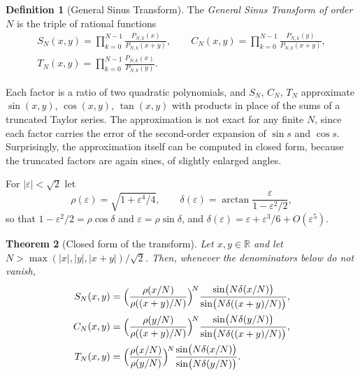 \documentclass[11pt]{amsart}
\newtheorem{thm}{Theorem}[section]
\theoremstyle{definition}
\newtheorem{defn}[thm]{Definition}
\theoremstyle{remark}
\numberwithin{equation}{section}
\begin{document}
\begin{defn}[General Sinus Transform]
\label{defn:GST}
The \emph{General Sinus Transform of order $N$} is the triple of rational
functions
\begin{gather*}
S_N(x,y) = \prod_{k=0}^{N-1}\frac{P_{N,k}(x)}{P_{N,k}(x+y)}, \qquad
C_N(x,y) = \prod_{k=0}^{N-1}\frac{P_{N,k}(y)}{P_{N,k}(x+y)}, \\
T_N(x,y) = \prod_{k=0}^{N-1}\frac{P_{N,k}(x)}{P_{N,k}(y)} .
\end{gather*}
\end{defn}

Each factor is a ratio of two quadratic polynomials, and $S_N$, $C_N$,
$T_N$ approximate $\sin(x,y)$, $\cos(x,y)$, $\tan(x,y)$ with products in
place of the sums of a truncated Taylor series. The approximation is not
exact for any finite $N$, since each factor carries the error of the
second-order expansion of $\sin s$ and $\cos s$. Surprisingly, the
approximation itself can be computed in closed form, because the
truncated factors are again sines, of slightly enlarged angles.

For $|\varepsilon| < \sqrt2$ let
\begin{equation}
\label{eq:rho-delta}
\rho(\varepsilon) = \sqrt{1 + \varepsilon^4/4}, \qquad
\delta(\varepsilon) = \arctan\frac{\varepsilon}{1 - \varepsilon^2/2},
\end{equation}
so that $1 - \varepsilon^2/2 = \rho\cos\delta$ and $\varepsilon = \rho\sin\delta$,
and $\delta(\varepsilon) = \varepsilon + \varepsilon^3/6 + O(\varepsilon^5)$.

\begin{thm}[Closed form of the transform]
\label{thm:GST-closed}
Let $x, y \in \mathbb{R}$ and let $N > \max(|x|, |y|, |x+y|)/\sqrt2$. Then,
whenever the denominators below do not vanish,
\begin{align}
\label{eq:SN-closed}
S_N(x,y) &= \Bigl(\frac{\rho(x/N)}{\rho((x+y)/N)}\Bigr)^{\!N}
\frac{\sin\bigl(N\delta(x/N)\bigr)}{\sin\bigl(N\delta((x+y)/N)\bigr)}, \\
C_N(x,y) &= \Bigl(\frac{\rho(y/N)}{\rho((x+y)/N)}\Bigr)^{\!N}
\frac{\sin\bigl(N\delta(y/N)\bigr)}{\sin\bigl(N\delta((x+y)/N)\bigr)}, \notag \\
T_N(x,y) &= \Bigl(\frac{\rho(x/N)}{\rho(y/N)}\Bigr)^{\!N}
\frac{\sin\bigl(N\delta(x/N)\bigr)}{\sin\bigl(N\delta(y/N)\bigr)}. \notag
\end{align}
\end{thm}
\end{document}
